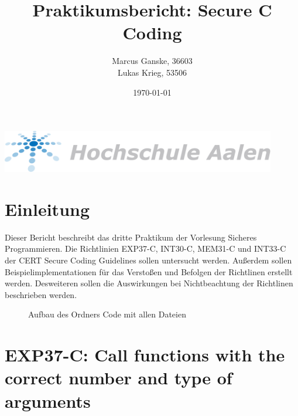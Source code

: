 \documentclass[12pt]{article}
\title{Praktikumsbericht: Secure C Coding}
\author{Marcus Ganske, 36603\\
		Lukas Krieg, 53506}
\date{\today}
\begin{document}
\maketitle
\vspace{+8cm}{
}
\includegraphics[width=12cm]{Hochschule-aalen.pdf}

\newpage
\renewcommand\contentsname{Inhaltsverzeichnis}
\tableofcontents
\newpage

	
	\section{Einleitung}
    Dieser Bericht beschreibt das dritte Praktikum der Vorlesung Sicheres Programmieren. Die Richtlinien EXP37-C, INT30-C, MEM31-C und INT33-C der CERT Secure Coding Guidelines sollen untersucht werden. Au{\ss}erdem sollen Beispielimplementationen f\"ur das Versto{\ss}en und Befolgen der Richtlinen erstellt werden. Desweiteren sollen die Auswirkungen bei Nichtbeachtung der Richtlinen beschrieben werden.
	\begin{figure}[H]
	
		\caption{Aufbau des Ordners Code mit allen Dateien}
	\end{figure}	

\newpage
\section{EXP37-C: Call functions with the correct number and type of arguments}
\end{document}
